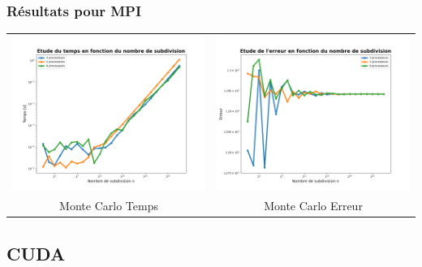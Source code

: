 \documentclass[10pt]{beamer}
\begin{document}
\begin{frame}
    \frametitle{Résultats pour MPI}
        \small
    \begin{tabular}{cc}
        \includegraphics[width=0.45\linewidth]{../Images/time_montecarlo_MPI.png} &
        \includegraphics[width=0.45\linewidth]{../Images/error_montecarlo_MPI.png} \\
        Monte Carlo Temps & Monte Carlo Erreur\\
    \end{tabular}
        
\end{frame}

\subsection{CUDA}
\end{document}
